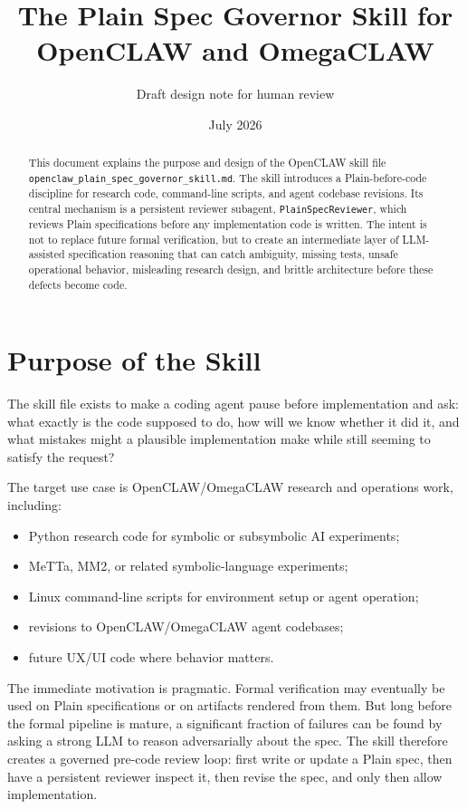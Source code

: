 \documentclass[11pt]{article}
\title{The Plain Spec Governor Skill for OpenCLAW and OmegaCLAW}
\author{Draft design note for human review}
\date{July 2026}
\begin{document}
\maketitle

\begin{abstract}
This document explains the purpose and design of the OpenCLAW skill file
\texttt{openclaw\_plain\_spec\_governor\_skill.md}. The skill introduces a
Plain-before-code discipline for research code, command-line scripts, and agent
codebase revisions. Its central mechanism is a persistent reviewer subagent,
\texttt{PlainSpecReviewer}, which reviews Plain specifications before any
implementation code is written. The intent is not to replace future formal
verification, but to create an intermediate layer of LLM-assisted specification
reasoning that can catch ambiguity, missing tests, unsafe operational behavior,
misleading research design, and brittle architecture before these defects become
code.
\end{abstract}

\tableofcontents

\section{Purpose of the Skill}

The skill file exists to make a coding agent pause before implementation and ask:
what exactly is the code supposed to do, how will we know whether it did it, and
what mistakes might a plausible implementation make while still seeming to
satisfy the request?

The target use case is OpenCLAW/OmegaCLAW research and operations work, including:

\begin{itemize}[nosep]
\item Python research code for symbolic or subsymbolic AI experiments;
\item MeTTa, MM2, or related symbolic-language experiments;
\item Linux command-line scripts for environment setup or agent operation;
\item revisions to OpenCLAW/OmegaCLAW agent codebases;
\item future UX/UI code where behavior matters.
\end{itemize}

The immediate motivation is pragmatic. Formal verification may eventually be used
on Plain specifications or on artifacts rendered from them. But long before the
formal pipeline is mature, a significant fraction of failures can be found by
asking a strong LLM to reason adversarially about the spec. The skill therefore
creates a governed pre-code review loop: first write or update a Plain spec, then
have a persistent reviewer inspect it, then revise the spec, and only then allow
implementation.
\end{document}
